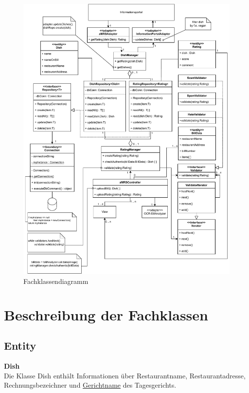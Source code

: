 \begin{figure}[H]
    \centering
    \caption{Fachklassendiagramm} \label{fig:Fachklassendiagramm}
    \includegraphics[width=\textwidth,keepaspectratio]{images/Fachklassenmodell}
\end{figure}

\section*{Beschreibung der Fachklassen}

\subsection*{Entity}
\textbf{Dish} \\
Die Klasse Dish enthält Informationen über Restaurantname, Restaurantadresse, Rechnungsbezeichner und \hyperref[gls:gerichtname]{Gerichtname} des
Tagesgerichts.
\newline

